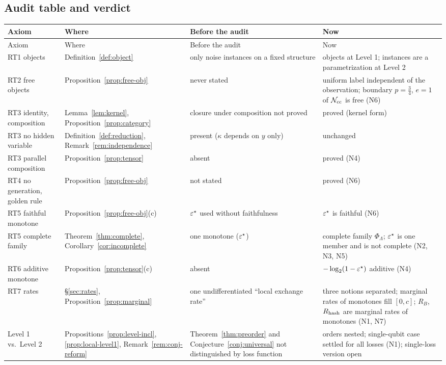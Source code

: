 \subsection{Audit table and verdict}\label{sec:audit-table}

{\footnotesize
\begin{longtable}{p{2.6cm} p{3.4cm} p{3.6cm} p{3.6cm}}
\toprule
Axiom & Where & Before the audit & Now \\
\midrule
\endfirsthead
\toprule
Axiom & Where & Before the audit & Now \\
\midrule
\endhead
RT1 objects & Definition~\ref{def:object} & only noise instances on a fixed structure & objects at Level 1; instances are a parametrization at Level 2 \\
RT2 free objects & Proposition~\ref{prop:free-obj} & never stated & uniform label independent of the observation; boundary $p=\tfrac34$, $e=1$ of $\mathcal{N}_{\rm cc}$ is free (N6) \\
RT3 identity, composition & Lemma~\ref{lem:kernel}, Proposition~\ref{prop:category} & closure under composition not proved & proved (kernel form) \\
RT3 no hidden variable & Definition~\ref{def:reduction}, Remark~\ref{rem:independence} & present ($\kappa$ depends on $y$ only) & unchanged \\
RT3 parallel composition & Proposition~\ref{prop:tensor} & absent & proved (N4) \\
RT4 no generation, golden rule & Proposition~\ref{prop:free-obj} & not stated & proved (N6) \\
RT5 faithful monotone & Proposition~\ref{prop:free-obj}(c) & $\varepsilon^{\star}$ used without faithfulness & $\varepsilon^{\star}$ is faithful (N6) \\
RT5 complete family & Theorem~\ref{thm:complete}, Corollary~\ref{cor:incomplete} & one monotone ($\varepsilon^{\star}$) & complete family $\Phi_\Lambda$; $\varepsilon^{\star}$ is one member and is not complete (N2, N3, N5) \\
RT6 additive monotone & Proposition~\ref{prop:tensor}(c) & absent & $-\log_2(1-\varepsilon^{\star})$ additive (N4) \\
RT7 rates & \S\ref{sec:rates}, Proposition~\ref{prop:marginal} & one undifferentiated ``local exchange rate'' & three notions separated; marginal rates of monotones fill $[0,c]$; $R_B$, $R_{\rm hash}$ are marginal rates of monotones (N1, N7) \\
Level 1 vs.\ Level 2 & Propositions~\ref{prop:level-incl}, \ref{prop:local-level1}, Remark~\ref{rem:conj-reform} & Theorem~\ref{thm:preorder} and Conjecture~\ref{conj:universal} not distinguished by loss function & orders nested; single-qubit case settled for all losses (N1); single-loss version open \\
\bottomrule
\end{longtable}
}

